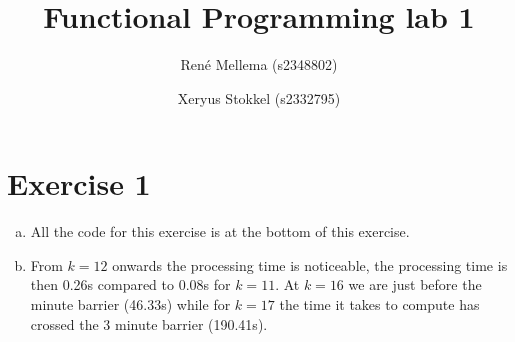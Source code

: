 \documentclass[a4paper]{article}
\title{Functional Programming lab 1}
\author{Ren\'e Mellema (s2348802) \and Xeryus Stokkel (s2332795)}
\begin{document}
\maketitle

\section*{Exercise 1}
\begin{enumerate}[(a)]
	\item All the code for this exercise is at the bottom of this exercise.
	\item From $k=12$ onwards the processing time is noticeable, the processing time is then 0.26s compared to 0.08s for $k=11$. At $k=16$ we are just before the minute barrier (46.33s) while for $k=17$ the time it takes to compute has crossed the 3 minute barrier (190.41s).
\end{enumerate}


\end{document}
